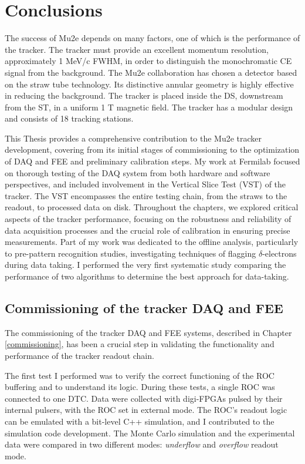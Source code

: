 \chapter{Conclusions}\label{conclusions}
The success of Mu2e depends on many factors, 
one of which is the performance of the tracker. 
The tracker must provide an excellent momentum 
resolution, approximately 1 MeV/c FWHM, 
in order to distinguish the monochromatic CE 
signal from the background. 
The Mu2e collaboration has chosen a detector 
based on the straw tube technology.  
Its distinctive annular geometry is highly 
effective in reducing the background. 
The tracker is placed inside the 
DS, downstream from the ST, 
in a uniform 1 T magnetic field. The tracker  
has a modular design and consists of 18 tracking stations.

This Thesis provides a comprehensive 
contribution to the Mu2e tracker 
development, covering from its initial stages of 
commissioning to the optimization 
of DAQ and FEE and preliminary calibration 
steps. My work at Fermilab 
focused on thorough testing of the DAQ system 
from both hardware and 
software perspectives, and included 
involvement in the Vertical Slice Test 
(VST) of the tracker. 
The VST encompasses the entire testing 
chain, from the straws to the readout, 
to processed data on disk.
Throughout the chapters, we explored 
critical aspects of the tracker performance,
focusing on the robustness and 
reliability of data acquisition 
processes and the crucial role of 
calibration in ensuring precise measurements. 
Part of my work was dedicated to the offline 
analysis, particularly to pre-pattern recognition 
studies, investigating techniques of   
flagging $\delta$-electrons during data taking. 
I performed the very first systematic study 
comparing the performance of two algorithms 
to determine the best approach for data-taking. 
\section{Commissioning of the tracker DAQ and FEE}
The commissioning of the tracker DAQ and FEE 
systems, described in Chapter 
\ref{commissioning}, has been a crucial step 
in validating the functionality 
and performance of the tracker readout chain.

The first test I performed was to verify the 
correct functioning of 
the ROC buffering and to understand its logic. 
During these tests, a single 
ROC was connected to one DTC. Data were 
collected with digi-FPGAs pulsed 
by their internal pulsers, with the ROC set 
in external mode. The ROC's  
readout logic can be emulated with a bit-level 
C++ simulation, and I contributed to the simulation code development. 
The Monte Carlo simulation 
and the experimental data were compared in two different modes: 
\textit{underflow} and \textit{overflow} readout mode.

